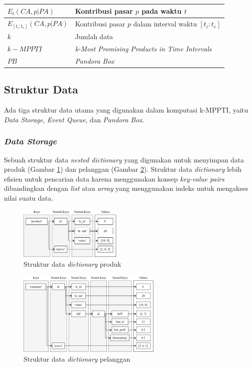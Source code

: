 \documentclass[conference]{IEEEtran}
\begin{document}
\begin{table}[htbp]
\begin{center}
\begin{tabular}{| p{2.5cm} | p{4.5cm} |}
		$E_t(CA, p|PA)$ & Kontribusi pasar $p$ pada waktu $t$ \\ \hline
		$E_{[t_i:t_e]}(CA, p|PA)$ & Kontribusi pasar $p$ dalam interval waktu $[t_i:t_e]$\\ \hline
		$k$ & Jumlah data \\ \hline
		$k-MPPTI$ & \textit{k-Most Promising Products in Time Intervals} \\ \hline
		$PB$ & \textit{Pandora Box} \\ \hline
		\end{tabular}
		\label{tab:notasi}
	\end{center}
\end{table}

\subsection{Struktur Data}
Ada tiga struktur data utama yang digunakan dalam komputasi k-MPPTI, yaitu \textit{Data Storage}, \textit{Event Queue}, dan \textit{Pandora Box}.

\subsubsection{\textbf{\textit{Data Storage}}}
Sebuah struktur data \textit{nested dictionary} yang digunakan untuk menyimpan data produk (Gambar \ref{fig:sd1}) dan pelanggan (Gambar \ref{fig:sd2}). Struktur data \textit{dictionary} lebih efisien untuk pencarian data karena menggunakan konsep \textit{key-value pairs} dibandingkan dengan \textit{list} atau \textit{array} yang menggunakan indeks untuk mengakses nilai suatu data. 

\begin{figure}[htbp]
	\centering
	\includegraphics[width=5cm]{img/bab3/sd1.png}
	\caption{Struktur data \textit{dictionary} produk}
	\label{fig:sd1}
\end{figure}

\begin{figure}[htbp]
	\centering
	\includegraphics[width=7cm]{img/bab3/sd2.png}
	\caption{Struktur data \textit{dictionary} pelanggan}
	\label{fig:sd2}
\end{figure}
\end{document}
